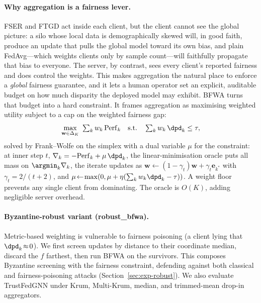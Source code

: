 \paragraph{Why aggregation is a fairness lever.}
FSER and FTGD act inside each client, but the client cannot see the global
picture: a silo whose local data is demographically skewed will, in good faith,
produce an update that pulls the global model toward its own bias, and plain
FedAvg---which weights clients only by sample count---will faithfully propagate
that bias to everyone. The server, by contrast, sees every client's reported
fairness and does control the weights. This makes aggregation the natural place
to enforce a \emph{global} fairness guarantee, and it lets a human operator set
an explicit, auditable budget on how much disparity the deployed model may
exhibit. BFWA turns that budget into a hard constraint. It frames aggregation as
maximising weighted utility subject to a cap on the weighted fairness gap:
\begin{equation}
\max_{\mathbf{w}\in\Delta_K}\ \textstyle\sum_k w_k\,\mathrm{Perf}_k
\quad\text{s.t.}\quad \textstyle\sum_k w_k\,\dpd_k\le\tau,
\end{equation}
solved by Frank--Wolfe on the simplex with a dual variable $\mu$ for the
constraint: at inner step $t$, $\nabla_k=-\mathrm{Perf}_k+\mu\,\dpd_k$, the
linear-minimisation oracle puts all mass on $\argmin_k\nabla_k$, the iterate
updates as $\mathbf{w}\!\leftarrow\!(1-\gamma_t)\mathbf{w}+\gamma_t\mathbf{e}_{k^*}$
with $\gamma_t=2/(t+2)$, and $\mu\!\leftarrow\!\max(0,\mu+\eta(\sum_k w_k\dpd_k-\tau))$.
A weight floor prevents any single client from dominating. The oracle is $O(K)$,
adding negligible server overhead.

\paragraph{Byzantine-robust variant (robust\_bfwa).}
Metric-based weighting is vulnerable to fairness poisoning (a client lying that
$\dpd_k\!\approx\!0$). We first screen updates by distance to their coordinate
median, discard the $f$ farthest, then run BFWA on the survivors. This composes
Byzantine screening with the fairness constraint, defending against both
classical and fairness-poisoning attacks (Section~\ref{sec:exp-robust}). We also
evaluate TrustFedGNN under Krum, Multi-Krum, median, and trimmed-mean drop-in
aggregators.

